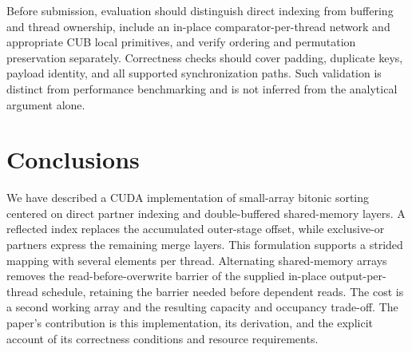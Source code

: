 \documentclass[fleqn,10pt,lineno]{wlpeerj}
\begin{document}
Before submission, evaluation should distinguish direct indexing from buffering and thread ownership, include an in-place comparator-per-thread network and appropriate CUB local primitives, and verify ordering and permutation preservation separately. Correctness checks should cover padding, duplicate keys, payload identity, and all supported synchronization paths. Such validation is distinct from performance benchmarking and is not inferred from the analytical argument alone.

\section*{Conclusions}
\label{sec:conclusion}
We have described a CUDA implementation of small-array bitonic sorting centered on direct partner indexing and double-buffered shared-memory layers. A reflected index replaces the accumulated outer-stage offset, while exclusive-or partners express the remaining merge layers. This formulation supports a strided mapping with several elements per thread. Alternating shared-memory arrays removes the read-before-overwrite barrier of the supplied in-place output-per-thread schedule, retaining the barrier needed before dependent reads. The cost is a second working array and the resulting capacity and occupancy trade-off. The paper's contribution is this implementation, its derivation, and the explicit account of its correctness conditions and resource requirements.


\end{document}
